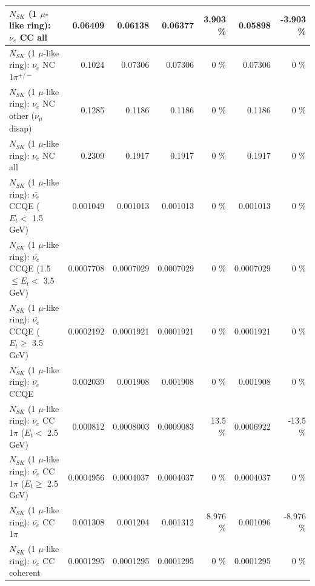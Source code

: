 \begin{table}
\begin{tabular}{| l | r | r | r  r | r  r |}
                                  $N_{SK}$ (1 $\mu$-like ring): $\nu_{e}$ CC all &         0.06409 &         0.06138 &         0.06377 &    3.903 \%  &         0.05898 &   -3.903 \%  \\ 
\hline
                           $N_{SK}$ (1 $\mu$-like ring): $\nu_e$ NC 1$\pi^{+/-}$ &          0.1024 &         0.07306 &         0.07306 &        0 \%  &         0.07306 &        0 \%  \\ 
                $N_{SK}$ (1 $\mu$-like ring): $\nu_e$ NC other ($\nu_\mu$ disap) &          0.1285 &          0.1186 &          0.1186 &        0 \%  &          0.1186 &        0 \%  \\ 
                                  $N_{SK}$ (1 $\mu$-like ring): $\nu_{e}$ NC all &          0.2309 &          0.1917 &          0.1917 &        0 \%  &          0.1917 &        0 \%  \\ 
\hline
\hline
\hline
            $N_{SK}$ (1 $\mu$-like ring): $\bar{\nu_e}$ CCQE ($E_{t} <$ 1.5 GeV) &        0.001049 &        0.001013 &        0.001013 &        0 \%  &        0.001013 &        0 \%  \\ 
   $N_{SK}$ (1 $\mu$-like ring): $\bar{\nu_e}$ CCQE (1.5 $\leq E_{t} <$ 3.5 GeV) &       0.0007708 &       0.0007029 &       0.0007029 &        0 \%  &       0.0007029 &        0 \%  \\ 
         $N_{SK}$ (1 $\mu$-like ring): $\bar{\nu_e}$ CCQE ($E_{t} \geq$ 3.5 GeV) &       0.0002192 &       0.0001921 &       0.0001921 &        0 \%  &       0.0001921 &        0 \%  \\ 
\hline
                                $N_{SK}$ (1 $\mu$-like ring): $\bar{\nu_e}$ CCQE &        0.002039 &        0.001908 &        0.001908 &        0 \%  &        0.001908 &        0 \%  \\ 
\hline
       $N_{SK}$ (1 $\mu$-like ring): $\bar{\nu_e}$ CC 1$\pi$ ($E_{t} <$ 2.5 GeV) &        0.000812 &       0.0008003 &       0.0009083 &     13.5 \%  &       0.0006922 &    -13.5 \%  \\ 
    $N_{SK}$ (1 $\mu$-like ring): $\bar{\nu_e}$ CC 1$\pi$ ($E_{t} \geq$ 2.5 GeV) &       0.0004956 &       0.0004037 &       0.0004037 &        0 \%  &       0.0004037 &        0 \%  \\ 
\hline
                           $N_{SK}$ (1 $\mu$-like ring): $\bar{\nu_e}$ CC 1$\pi$ &        0.001308 &        0.001204 &        0.001312 &    8.976 \%  &        0.001096 &   -8.976 \%  \\ 
                         $N_{SK}$ (1 $\mu$-like ring): $\bar{\nu_e}$ CC coherent &       0.0001295 &       0.0001295 &       0.0001295 &        0 \%  &       0.0001295 &        0 \%  \\ 

\end{tabular}
\end{table}
